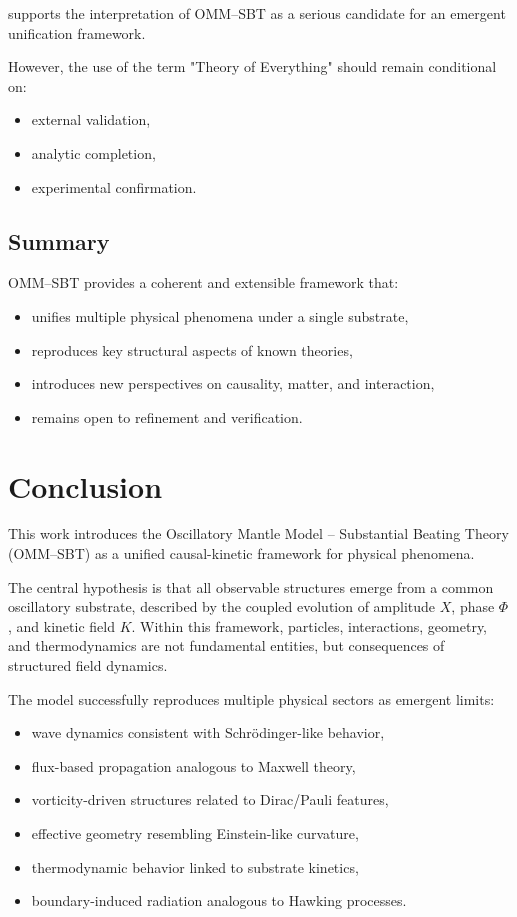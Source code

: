 \documentclass[11pt]{article}
\begin{document}
supports the interpretation of OMM--SBT as a serious candidate for an emergent unification framework.

However, the use of the term "Theory of Everything" should remain conditional on:

\begin{itemize}
\item external validation,
\item analytic completion,
\item experimental confirmation.
\end{itemize}

\subsection{Summary}

OMM--SBT provides a coherent and extensible framework that:

\begin{itemize}
\item unifies multiple physical phenomena under a single substrate,
\item reproduces key structural aspects of known theories,
\item introduces new perspectives on causality, matter, and interaction,
\item remains open to refinement and verification.
\end{itemize}

\section{Conclusion}

This work introduces the Oscillatory Mantle Model -- Substantial Beating Theory (OMM--SBT) as a unified causal-kinetic framework for physical phenomena.

The central hypothesis is that all observable structures emerge from a common oscillatory substrate, described by the coupled evolution of amplitude $X$, phase $\Phi$, and kinetic field $K$. Within this framework, particles, interactions, geometry, and thermodynamics are not fundamental entities, but consequences of structured field dynamics.

The model successfully reproduces multiple physical sectors as emergent limits:

\begin{itemize}
\item wave dynamics consistent with Schrödinger-like behavior,
\item flux-based propagation analogous to Maxwell theory,
\item vorticity-driven structures related to Dirac/Pauli features,
\item effective geometry resembling Einstein-like curvature,
\item thermodynamic behavior linked to substrate kinetics,
\item boundary-induced radiation analogous to Hawking processes.
\end{itemize}
\end{document}
